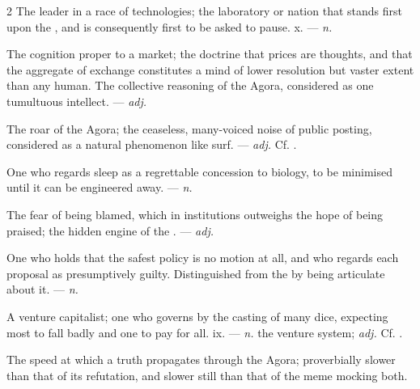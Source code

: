 \begin{multicols}{2}
 The leader in a race of technologies; the laboratory or nation that stands first upon the , and is consequently first to be asked to pause.   x. —  \textit{n.}

  The cognition proper to a market; the doctrine that prices are thoughts, and that the aggregate of exchange constitutes a mind of lower resolution but vaster extent than any human.   The collective reasoning of the Agora, considered as one tumultuous intellect. —  \textit{adj.}

 The roar of the Agora; the ceaseless, many-voiced noise of public posting, considered as a natural phenomenon like surf.  —  \textit{adj.} Cf. .

 One who regards sleep as a regrettable concession to biology, to be minimised until it can be engineered away.  —  \textit{n.}

 The fear of being blamed, which in institutions outweighs the hope of being praised; the hidden engine of the . —  \textit{adj.}

 One who holds that the safest policy is no motion at all, and who regards each proposal as presumptively guilty. Distinguished from the  by being articulate about it. —  \textit{n.}

 A venture capitalist; one who governs by the casting of many dice, expecting most to fall badly and one to pay for all.   ix. —  \textit{n.} the venture system;  \textit{adj.} Cf. .

 The speed at which a truth propagates through the Agora; proverbially slower than that of its refutation, and slower still than that of the meme mocking both.  


\end{multicols}

